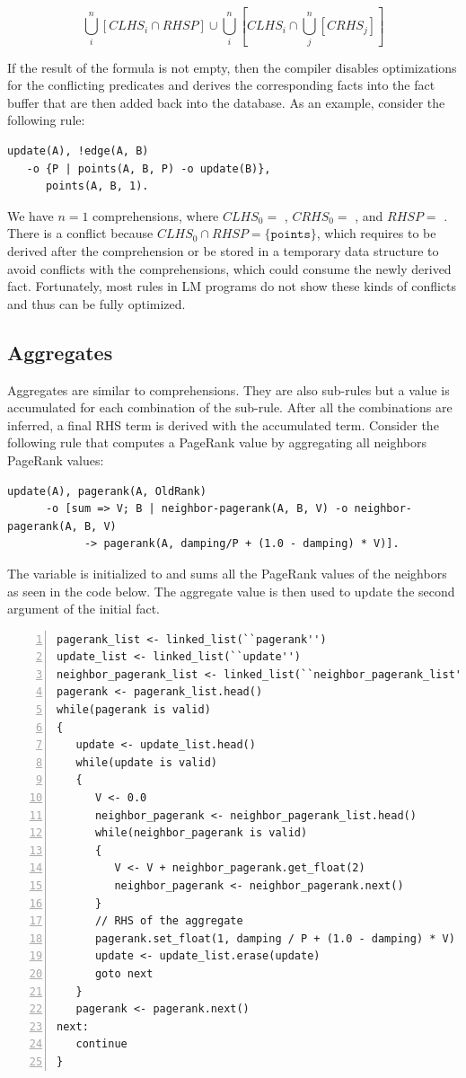 \[
\bigcup^{n}_i[CLHS_i \cap RHSP] \cup \bigcup^{n}_i [CLHS_i \cap \bigcup^{n}_j[CRHS_j]]
\]

If the result of the formula is not empty, then the compiler disables
optimizations for the conflicting predicates and derives the corresponding facts
into the fact buffer that are then added back into the database. As an example,
consider the following rule:

\begin{Verbatim}[fontsize=\codesize]
update(A), !edge(A, B)
   -o {P | points(A, B, P) -o update(B)},
      points(A, B, 1).
\end{Verbatim}

We have $n = 1$ comprehensions, where $CLHS_0 = $ ,
$CRHS_0 =$ , and $RHSP = $ . There is a
conflict because $CLHS_0 \cap RHSP = \{\mathtt{points}\}$, which requires
 to be derived after the comprehension or be stored in a
temporary data structure to avoid conflicts with the comprehensions, which could
consume the newly derived fact. Fortunately, most rules in LM programs do not
show these kinds of conflicts and thus can be fully optimized.

\subsection{Aggregates}

Aggregates are similar to comprehensions. They are also sub-rules but a value is
accumulated for each combination of the sub-rule. After all the combinations are
inferred, a final RHS term is derived with the accumulated term. Consider the
following rule that computes a PageRank value by aggregating all neighbors
PageRank values:

\begin{Verbatim}[fontsize=\codesize]
update(A), pagerank(A, OldRank)
      -o [sum => V; B | neighbor-pagerank(A, B, V) -o neighbor-pagerank(A, B, V)
            -> pagerank(A, damping/P + (1.0 - damping) * V)].
\end{Verbatim}

The variable  is initialized to  and sums all the PageRank
values of the neighbors as seen in the code below. The aggregate value is then
used to update the second argument of the initial  fact.

\begin{Verbatim}[numbers=left,fontsize=\codesize]
pagerank_list <- linked_list(``pagerank'')
update_list <- linked_list(``update'')
neighbor_pagerank_list <- linked_list(``neighbor_pagerank_list'')
pagerank <- pagerank_list.head()
while(pagerank is valid)
{
   update <- update_list.head()
   while(update is valid)
   {
      V <- 0.0
      neighbor_pagerank <- neighbor_pagerank_list.head()
      while(neighbor_pagerank is valid)
      {
         V <- V + neighbor_pagerank.get_float(2)
         neighbor_pagerank <- neighbor_pagerank.next()
      }
      // RHS of the aggregate
      pagerank.set_float(1, damping / P + (1.0 - damping) * V)
      update <- update_list.erase(update)
      goto next
   }
   pagerank <- pagerank.next()
next:
   continue
}
\end{Verbatim}

